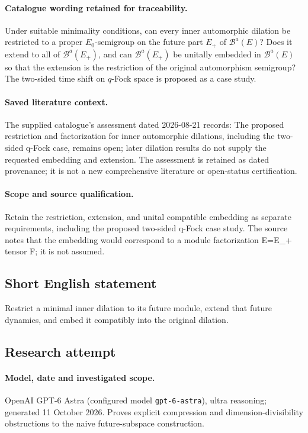 \documentclass[11pt]{article}
\begin{document}
\paragraph{Catalogue wording retained for traceability.}
Under suitable minimality conditions, can every inner automorphic dilation be restricted to a proper $E_0$-semigroup on the future part $E_+$ of $\mathcal B^a(E)$? Does it extend to all of $\mathcal B^a(E_+)$, and can $\mathcal B^a(E_+)$ be unitally embedded in $\mathcal B^a(E)$ so that the extension is the restriction of the original automorphism semigroup? The two-sided time shift on $q$-Fock space is proposed as a case study.

\paragraph{Saved literature context.} The supplied catalogue's assessment dated 2026-08-21 records: The proposed restriction and factorization for inner automorphic dilations, including the two-sided q-Fock case, remains open; later dilation results do not supply the requested embedding and extension. The assessment is retained as dated provenance; it is not a new comprehensive literature or open-status certification.
\paragraph{Scope and source qualification.}Retain the restriction, extension, and unital compatible embedding as separate requirements, including the proposed two-sided q-Fock case study. The source notes that the embedding would correspond to a module factorization E=E_+ tensor F; it is not assumed.
\subsection{Short English statement}
Restrict a minimal inner dilation to its future module, extend that future dynamics, and embed it compatibly into the original dilation.
\subsection{Research attempt}
\paragraph{Model, date and investigated scope.}
OpenAI GPT-6 Astra (configured model \texttt{gpt-6-astra}), ultra reasoning; generated 11 October 2026. Proves explicit compression and dimension-divisibility obstructions to the naive future-subspace construction.
\end{document}
